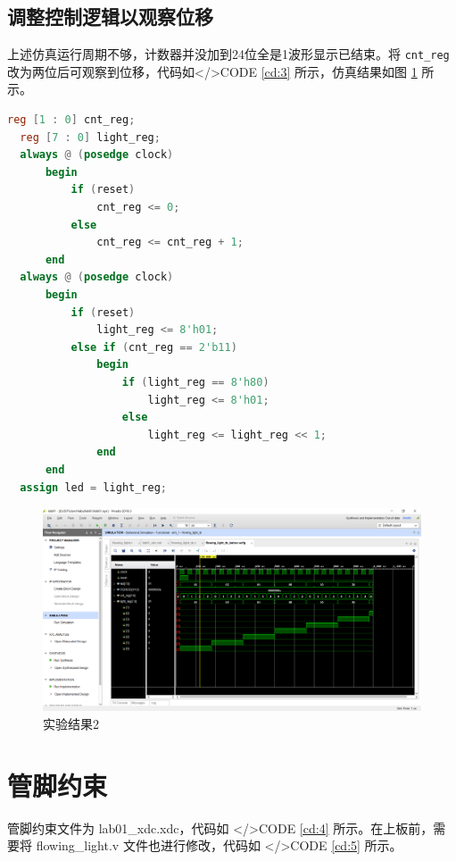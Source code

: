 \documentclass{progartcn}
\begin{document}
\subsection{调整控制逻辑以观察位移}

上述仿真运行周期不够，计数器并没加到24位全是1波形显示已结束。将 \verb|cnt_reg| 改为两位后可观察到位移，代码如</>CODE \ref{cd:3} 所示，仿真结果如图 \ref{fig:2} 所示。

\begin{lstlisting}[language=verilog,caption={修改后的flowing light},label={cd:3}]
  reg [1 : 0] cnt_reg;
  reg [7 : 0] light_reg;
  always @ (posedge clock)
      begin
          if (reset)
              cnt_reg <= 0;
          else
              cnt_reg <= cnt_reg + 1;
      end
  always @ (posedge clock)
      begin
          if (reset)
              light_reg <= 8'h01;
          else if (cnt_reg == 2'b11)
              begin
                  if (light_reg == 8'h80)
                      light_reg <= 8'h01;
                  else
                      light_reg <= light_reg << 1;
              end
      end
  assign led = light_reg;
\end{lstlisting}

\begin{figure}[htbp]
  \centering
  \includegraphics[scale=0.3]{../figure/01/lab01-2.PNG}
  \caption{实验结果2}\label{fig:2}
\end{figure}

\section{管脚约束}

管脚约束文件为 lab01\_xdc.xdc，代码如 </>CODE \ref{cd:4} 所示。在上板前，需要将 flowing\_light.v 文件也进行修改，代码如 </>CODE \ref{cd:5} 所示。
\end{document}
